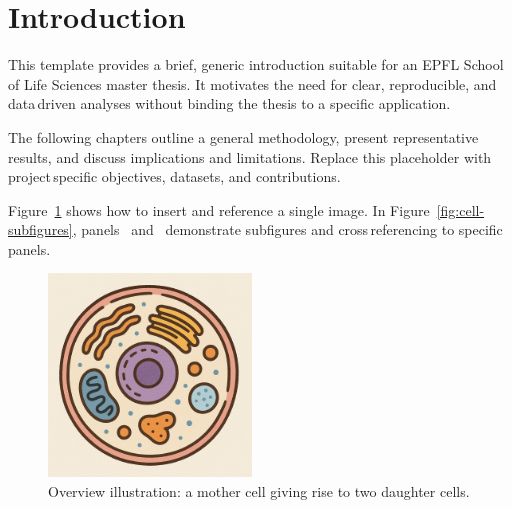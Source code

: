 \section{Introduction}

\noindent This template provides a brief, generic introduction suitable for an EPFL School of Life Sciences master thesis. It motivates the need for clear, reproducible, and data\,driven analyses without binding the thesis to a specific application.

\noindent The following chapters outline a general methodology, present representative results, and discuss implications and limitations. Replace this placeholder with project\,specific objectives, datasets, and contributions.

\bigskip

\noindent Figure~\ref{fig:cell-overview} shows how to insert and reference a single image. In Figure~\ref{fig:cell-subfigures}, panels~ and~ demonstrate subfigures and cross\,referencing to specific panels.

\begin{figure}[h]
  \centering
  \includegraphics[width=0.48\textwidth]{figures/cell.png}
  \caption{Overview illustration: a mother cell giving rise to two daughter cells.}
  \label{fig:cell-overview}
\end{figure}

